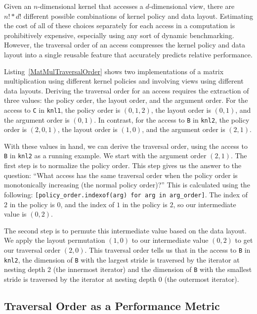 \documentclass[sigconf, table]{acmart}
\begin{document}
Given an $n$-dimensional kernel that accesses a $d$-dimensional view, there are $n! * d!$ different possible combinations of kernel policy and data layout. 
Estimating the cost of all of these choices separately for each access in a computation is prohibitively expensive, especially using any sort of dynamic benchmarking. 
However, the traversal order of an access compresses the kernel policy and data layout into a single reusable feature that accurately predicts relative performance.




Listing~\ref{MatMulTraversalOrder} shows two implementations of a matrix multiplication using different kernel policies and involving views using different data layouts.
Deriving the traversal order for an access requires the extraction of three values: the policy order, the layout order, and the argument order. 
For the access to \verb.C. in \verb.knl1., the policy order is $(0,1,2)$, the layout order is $(0,1)$, and the argument order is $(0,1)$. 
In contrast, for the access to \verb.B. in \verb.knl2., the policy order is $(2,0,1)$, the layout order is $(1,0)$, and the argument order is $(2,1)$. 

With these values in hand, we can derive the traversal order, using the access to \verb.B. in \verb.knl2. as a running example. 
We start with the argument order $(2,1)$.
The first step is to normalize the policy order.
This step gives us the answer to the question: \enquote{What access has the same traversal order when the policy order is monotonically increasing (the normal policy order)?}
This is calculated using the following: \verb,[policy_order.indexof(arg) for arg in arg_order],. 
The index of $2$ in the policy is $0$, and the index of $1$ in the policy is $2$, so our intermediate value is $(0,2)$. 

The second step is to permute this intermediate value based on the data layout. 
We apply the layout permutation $(1,0)$ to our intermediate value $(0,2)$ to get our traversal order $(2,0)$. 
This traversal order tells us that in the access to \verb.B. in \verb.knl2., the dimension of \verb.B. with the largest stride is traversed by the iterator at nesting depth 2 (the innermost iterator) and the dimension of \verb.B. with the smallest stride is traversed by the iterator at nesting depth 0 (the outermost iterator). 

\subsection{Traversal Order as a Performance Metric}
\end{document}
